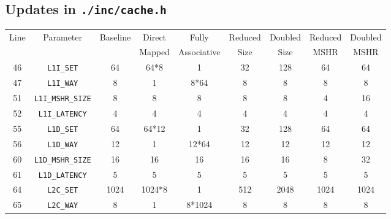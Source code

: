 \documentclass[11pt, swedish, openany]{book}
\begin{document}
\subsection*{Updates in \texttt{./inc/cache.h}}
\begin{table}[H]
    \begin{tabular}{||c|c||c||c|c||c|c||c|c||}
        \hline
        \multirow{2}{*}{Line} & \multirow{2}{*}{Parameter} & \multirow{2}{*}{Baseline} & Direct  & Fully       & Reduced & Doubled & Reduced & Doubled \\
                              &                            &                           & Mapped  & Associative & Size    & Size    & MSHR    & MSHR    \\
        \hline
        46                    & \texttt{L1I\_SET}          & 64                        & 64*8    & 1           & 32      & 128     & 64      & 64      \\
        47                    & \texttt{L1I\_WAY}          & 8                         & 1       & 8*64        & 8       & 8       & 8       & 8       \\
        51                    & \texttt{L1I\_MSHR\_SIZE}   & 8                         & 8       & 8           & 8       & 8       & 4       & 16      \\
        52                    & \texttt{L1I\_LATENCY}      & 4                         & 4       & 4           & 4       & 4       & 4       & 4       \\
        \hline
        55                    & \texttt{L1D\_SET}          & 64                        & 64*12   & 1           & 32      & 128     & 64      & 64      \\
        56                    & \texttt{L1D\_WAY}          & 12                        & 1       & 12*64       & 12      & 12      & 12      & 12      \\
        60                    & \texttt{L1D\_MSHR\_SIZE}   & 16                        & 16      & 16          & 16      & 16      & 8       & 32      \\
        61                    & \texttt{L1D\_LATENCY}      & 5                         & 5       & 5           & 5       & 5       & 5       & 5       \\
        \hline
        64                    & \texttt{L2C\_SET}          & 1024                      & 1024*8  & 1           & 512     & 2048    & 1024    & 1024    \\
        65                    & \texttt{L2C\_WAY}          & 8                         & 1       & 8*1024      & 8       & 8       & 8       & 8       \\

\end{tabular}
\end{table}
\end{document}
